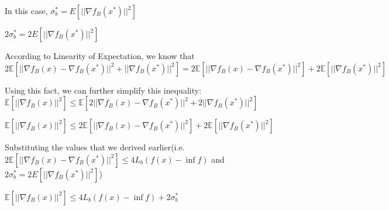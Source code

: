 In this case, 
\noindent $\sigma_b^* = E[||\nabla f_B(x^*)||^2]$ \newline 

$2 \sigma_b^* = 2 E[||\nabla f_B(x^*)||^2]$ \newline 

According to Linearity of Expectation, we know that \newline 
$2\mathbb{E} [||\nabla f_B(x) - \nabla f_B(x^*)||^2 + ||\nabla f_B(x^*)||^2] = 2\mathbb{E} [||\nabla f_B(x) - \nabla f_B(x^*)||^2] + 2 \mathbb{E}  [||\nabla f_B(x^*)||^2]$


Using this fact, we can further simplify this inequality: \noindent $\mathbb{E}[||\nabla f_B(x)||^2] \leq \mathbb{E} [2||\nabla f_B(x) - \nabla f_B(x^*)||^2 + 2||\nabla f_B(x^*)||^2]$ \newline 

\noindent $\mathbb{E}[||\nabla f_B(x)||^2] \leq 2\mathbb{E} [||\nabla f_B(x) - \nabla f_B(x^*)||^2] + 2 \mathbb{E}  [||\nabla f_B(x^*)||^2]$ \newline 

Substituting the values that we derived earlier(i.e. $2\mathbb{E}[||\nabla f_B(x) - \nabla f_B(x^*)||^2] \leq 4L_{b} (f(x) - \inf f)$ and $2 \sigma_b^* = 2 E[||\nabla f_B(x^*)||^2]$) \newline 

\noindent $\mathbb{E}[||\nabla f_B(x)||^2] \leq 4L_{b} (f(x) - \inf f) + 2 \sigma_b^*$ \newline 